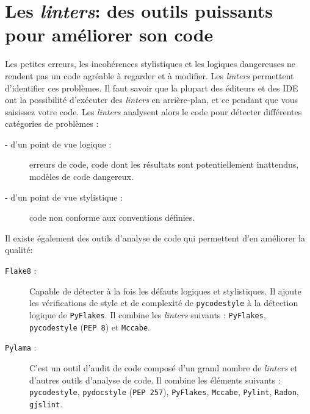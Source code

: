 \documentclass[a4paper,12pt]{book}
\begin{document}
\section{Les \textit{linters}: des outils puissants pour améliorer son code}
Les petites erreurs, les incohérences stylistiques et les logiques dangereuses ne rendent pas un code agréable à regarder et à modifier. Les \textit{linters} permettent d'identifier ces problèmes. Il faut savoir que la plupart des éditeurs et des IDE ont la possibilité d'exécuter des \textit{linters} en arrière-plan, et ce  pendant que vous saisissez votre code. Les \textit{linters} analysent alors le code pour détecter différentes catégories de problèmes :
\begin{description}
	\item[- d'un point de vue logique :] erreurs de code, code dont les résultats sont potentiellement inattendus, modèles de code dangereux.
	\item[- d'un point de vue stylistique :] code non conforme aux conventions définies.
\end{description}
\medskip

Il existe également des outils d'analyse de code qui permettent d’en améliorer la qualité:
\begin{description}
	\item[\texttt{Flake8} :] Capable de détecter à la fois les défauts logiques et stylistiques. Il ajoute les vérifications de style et de complexité de \texttt{pycodestyle} à la détection logique de \texttt{PyFlakes}. Il combine les \textit{linters} suivants : \texttt{PyFlakes}, \texttt{pycodestyle} (\texttt{PEP 8}) et \texttt{Mccabe}.
	\item[\texttt{Pylama} :] C'est un outil d'audit de code composé d'un grand nombre de \textit{linters} et d'autres outils d'analyse de code. Il combine les éléments suivants : \texttt{pycodestyle}, \texttt{pydocstyle} (\texttt{PEP 257}), \texttt{PyFlakes}, \texttt{Mccabe}, \texttt{Pylint}, \texttt{Radon}, \texttt{gjslint}.
\end{description}
\medskip
\end{document}

